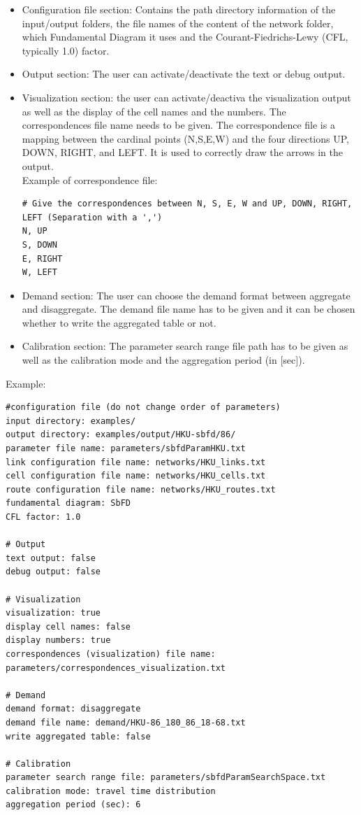 \documentclass[a4paper,12pt]{article}
\begin{document}
\begin{itemize}
\item Configuration file section: Contains the path directory information of the input/output folders, the file names of the content of the network folder, which Fundamental Diagram it uses and the Courant-Fiedrichs-Lewy (CFL, typically 1.0) factor.
\item Output section: The user can activate/deactivate the text or debug output.
\item Visualization section: the user can activate/deactiva the visualization output as well as the display of the cell names and the numbers. The correspondences file name needs to be given. The correspondence file is a mapping between the cardinal points (N,S,E,W) and the four directions UP, DOWN, RIGHT, and LEFT. It is used to correctly draw the arrows in the output.\\
\newline
Example of correspondence file: 

\begin{lstlisting}[breaklines]
# Give the correspondences between N, S, E, W and UP, DOWN, RIGHT, LEFT (Separation with a ',')
N, UP
S, DOWN
E, RIGHT
W, LEFT
\end{lstlisting}

\item Demand section:  The user can choose the demand format between aggregate and disaggregate. The demand file name has to be given and it can be chosen whether to write the aggregated table or not.
\item Calibration section: The parameter search range file path has to be given as well as the calibration mode and the aggregation period (in [sec]).
\end{itemize}
Example: 
\begin{small}
\begin{lstlisting}[breaklines]
#configuration file (do not change order of parameters)
input directory: examples/
output directory: examples/output/HKU-sbfd/86/
parameter file name: parameters/sbfdParamHKU.txt
link configuration file name: networks/HKU_links.txt
cell configuration file name: networks/HKU_cells.txt
route configuration file name: networks/HKU_routes.txt
fundamental diagram: SbFD
CFL factor: 1.0

# Output
text output: false
debug output: false

# Visualization
visualization: true
display cell names: false
display numbers: true
correspondences (visualization) file name: parameters/correspondences_visualization.txt

# Demand
demand format: disaggregate
demand file name: demand/HKU-86_180_86_18-68.txt
write aggregated table: false

# Calibration
parameter search range file: parameters/sbfdParamSearchSpace.txt
calibration mode: travel time distribution
aggregation period (sec): 6
\end{lstlisting}
\end{small}
\end{document}
